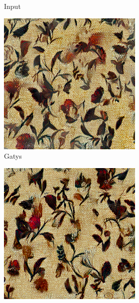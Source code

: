 \begin{figure}[ht]
\begin{subfigure}{0.8\textwidth}
\begin{subfigure}{0.32\textwidth}
            \caption{Input}
            \label{fig:methods_comparison_large-target}
        \end{subfigure}
        \hfill
        \begin{subfigure}{0.32\textwidth}
            \centering
            \includegraphics[width=\textwidth]{images/03-comparison_large_vanilla.jpg}
            \caption{Gatys}
            \label{fig:methods_comparison_large-vanilla}
        \end{subfigure}
        \hfill
        \begin{subfigure}{0.32\textwidth}
            \centering
            \includegraphics[width=\textwidth]{images/03-comparison_large_shift.jpg}

\end{subfigure}
\end{subfigure}
\end{figure}
